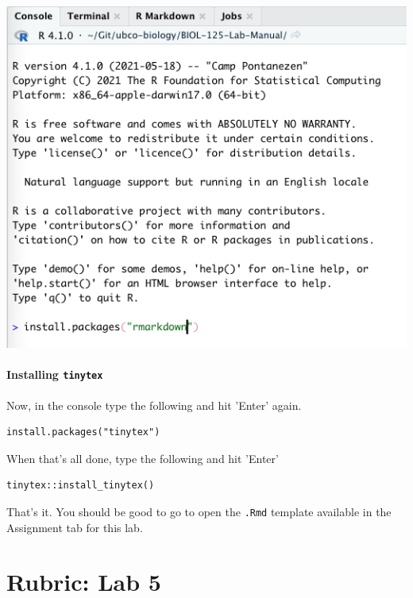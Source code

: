 \documentclass[
]{book}
\begin{document}
\includegraphics{images/Install-RMarkdown_20220101.png}

\hypertarget{installing-tinytex}{%
\subsubsection*{\texorpdfstring{Installing \texttt{tinytex}}{Installing tinytex}}\label{installing-tinytex}}

Now, in the console type the following and hit 'Enter' again.

\begin{verbatim}
install.packages("tinytex")
\end{verbatim}

When that's all done, type the following and hit 'Enter'

\begin{verbatim}
tinytex::install_tinytex()
\end{verbatim}

That's it. You should be good to go to open the \texttt{.Rmd} template available in the Assignment tab for this lab.

\hypertarget{rubric-lab-5}{%
\chapter*{Rubric: Lab 5}\label{rubric-lab-5}}
\end{document}
